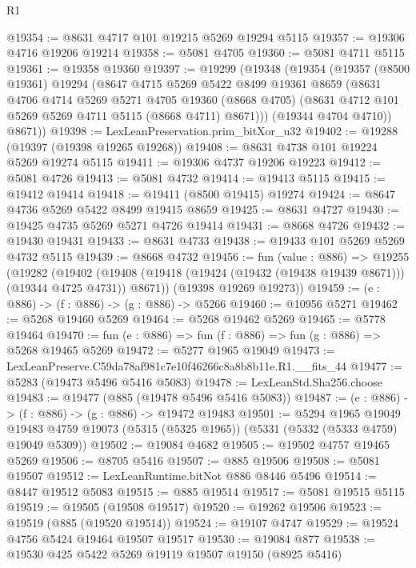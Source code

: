 \begin{lexlean}{R1}
\begin{coremodule}
@19354 := @8631 @4717 @101 @19215 @5269 @19294 @5115
@19357 := @19306 @4716 @19206 @19214
@19358 := @5081 @4705
@19360 := @5081 @4711 @5115
@19361 := @19358 @19360
@19397 := @19299
    (@19348
      (@19354
        (@19357
          (@8500 @19361)
          @19294
          (@8647
            @4715
            @5269
            @5422
            @8499
            @19361
            @8659
            (@8631
              @4706
              @4714
              @5269
              @5271
              @4705
              @19360
              (@8668 @4705)
              (@8631 @4712 @101 @5269 @5269 @4711 @5115 (@8668 @4711) @8671)))
          (@19344 @4704 @4710))
        @8671))
@19398 := LexLeanPreservation.prim_bitXor_u32
@19402 := @19288 (@19397 (@19398 @19265 @19268))
@19408 := @8631 @4738 @101 @19224 @5269 @19274 @5115
@19411 := @19306 @4737 @19206 @19223
@19412 := @5081 @4726
@19413 := @5081 @4732
@19414 := @19413 @5115
@19415 := @19412 @19414
@19418 := @19411 (@8500 @19415) @19274
@19424 := @8647 @4736 @5269 @5422 @8499 @19415 @8659
@19425 := @8631 @4727
@19430 := @19425 @4735 @5269 @5271 @4726 @19414
@19431 := @8668 @4726
@19432 := @19430 @19431
@19433 := @8631 @4733
@19438 := @19433 @101 @5269 @5269 @4732 @5115
@19439 := @8668 @4732
@19456 := fun (value : @886) =>
  @19255
    (@19282
      (@19402 (@19408 (@19418 (@19424 (@19432 (@19438 @19439 @8671))) (@19344 @4725 @4731)) @8671))
      (@19398 @19269 @19273))
@19459 := (e : @886) -> (f : @886) -> (g : @886) -> @5266
@19460 := @10956 @5271
@19462 := @5268 @19460 @5269
@19464 := @5268 @19462 @5269
@19465 := @5778 @19464
@19470 := fun (e : @886) => fun (f : @886) => fun (g : @886) => @5268 @19465 @5269
@19472 := @5277 @1965 @19049
@19473 := LexLeanPreserve.C59da78af981c7e10f46266c8a8b8b11e.R1.__fits_44
@19477 := @5283 (@19473 @5496 @5416 @5083)
@19478 := LexLeanStd.Sha256.choose
@19483 := @19477 (@885 (@19478 @5496 @5416 @5083))
@19487 := (e : @886) -> (f : @886) -> (g : @886) -> @19472 @19483
@19501 := @5294
    @1965
    @19049
    @19483
    @4759
    @19073
    (@5315 (@5325 @1965))
    (@5331 (@5332 (@5333 @4759) @19049 @5309))
@19502 := @19084 @4682
@19505 := @19502 @4757 @19465 @5269
@19506 := @8705 @5416
@19507 := @885 @19506
@19508 := @5081 @19507
@19512 := LexLeanRuntime.bitNot @886 @8446 @5496
@19514 := @8447 @19512 @5083
@19515 := @885 @19514
@19517 := @5081 @19515 @5115
@19519 := @19505 (@19508 @19517)
@19520 := @19262 @19506
@19523 := @19519 (@885 (@19520 @19514))
@19524 := @19107 @4747
@19529 := @19524 @4756 @5424 @19464 @19507 @19517
@19530 := @19084 @877
@19538 := @19530 @425 @5422 @5269 @19119 @19507 @19150 (@8925 @5416)

\end{coremodule}
\end{lexlean}
